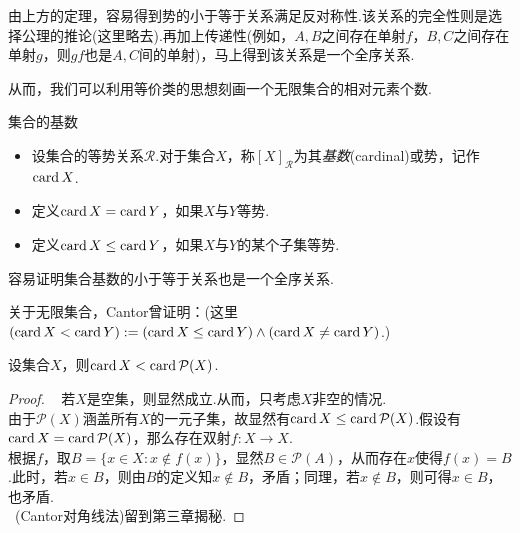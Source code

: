 由上方的定理，容易得到势的小于等于关系满足反对称性.该关系的完全性则是选择公理的推论(这里略去).再加上传递性(例如，$A,B$之间存在单射$f$，$B,C$之间存在单射$g$，则$gf$也是$A,C$间的单射)，马上得到该关系是一个全序关系.

从而，我们可以利用等价类的思想刻画一个无限集合的相对元素个数.

\begin{definition}{集合的基数}
	\begin{itemize}
		\item 设集合的等势关系$\mathcal{R}$.对于集合$X$，称$[X]_{\mathcal{R}}$为其\textit{基数}(cardinal)或势，记作$\operatorname{card} X$.
		\item 定义$\operatorname{card} X = \operatorname{card} Y$，如果$X$与$Y$等势.
		\item 定义$\operatorname{card} X \leq \operatorname{card} Y$，如果$X$与$Y$的某个子集等势.
	\end{itemize}
\end{definition}

容易证明集合基数的小于等于关系也是一个全序关系.

关于无限集合，Cantor曾证明：(这里$(\operatorname{card} X < \operatorname{card} Y):= (\operatorname{card} X \leq \operatorname{card} Y) \wedge (\operatorname{card} X \neq \operatorname{card} Y)$.)

\begin{theorem}
	设集合$X$，则$\operatorname{card} X < \operatorname{card} \mathcal{P}(X)$.
\end{theorem}
\begin{proof}
	~
	若$X$是空集，则显然成立.从而，只考虑$X$非空的情况. \\
	由于$\mathcal{P}(X)$涵盖所有$X$的一元子集，故显然有$\operatorname{card} X \leq \operatorname{card} \mathcal{P}(X)$.假设有$\operatorname{card} X = \operatorname{card} \mathcal{P}(X)$，那么存在双射$f:X \to X$. \\
	根据$f$，取$B=\{ x \in X:x \notin f(x) \}$，显然$B \in \mathcal{P}(A)$，从而存在$x$使得$f(x)=B$.此时，若$x \in B$，则由$B$的定义知$x \notin B$，矛盾；同理，若$x \notin B$，则可得$x \in B$，也矛盾. \\
	~(Cantor对角线法)留到第三章揭秘.
\end{proof}

